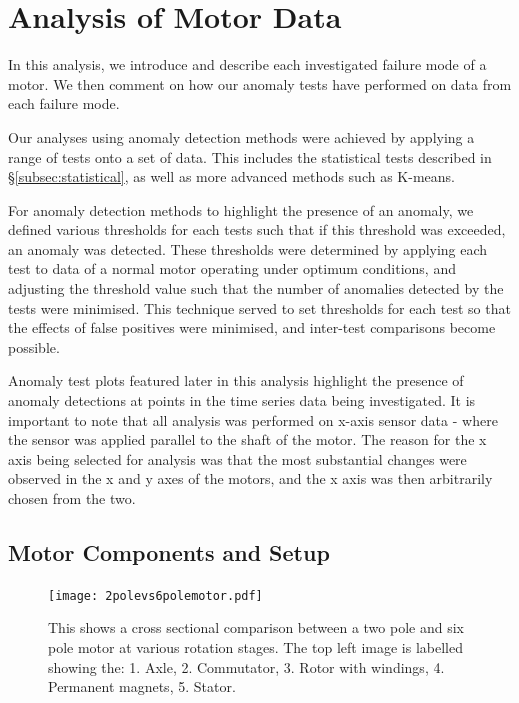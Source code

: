 \section{Analysis of Motor Data}
\label{sec:analysis}

In this analysis, we introduce and describe each investigated failure mode of a motor. We then comment on how our anomaly tests have performed on data from each failure mode.

Our analyses using anomaly detection methods were achieved by applying a range of tests onto a set of data. This includes the statistical tests described in \S\ref{subsec:statistical}, as well as more advanced methods such as K-means.

For anomaly detection methods to highlight the presence of an anomaly, we defined various thresholds for each tests such that if this threshold was exceeded, an anomaly was detected. These thresholds were determined by applying each test to data of a normal motor operating under optimum conditions, and adjusting the threshold value such that the number of anomalies detected by the tests were minimised. This technique served to set thresholds for each test so that the effects of false positives were minimised, and inter-test comparisons become possible.

Anomaly test plots featured later in this analysis highlight the presence of anomaly detections at points in the time series data being investigated. It is important to note that all analysis was performed on x-axis sensor data - where the sensor was applied parallel to the shaft of the motor. The reason for the x axis being selected for analysis was that the most substantial changes were observed in the x and y axes of the motors, and the x axis was then arbitrarily chosen from the two. 

\subsection{Motor Components and Setup}

\begin{figure}[t]
    \centering
    \texttt{[image: 2polevs6polemotor.pdf]}
    \caption[DC motor cross sectional comparison]{This shows a cross sectional comparison between a two pole and six pole motor at various rotation stages. The top left image is labelled showing the: 1. Axle, 2. Commutator, 3. Rotor with windings, 4. Permanent magnets, 5. Stator.}
    \label{fig:2pole_vs_6pole}
\end{figure}

